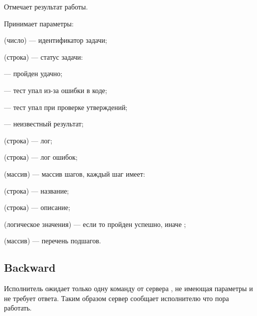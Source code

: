 Отмечает результат работы.

Принимает параметры:
\begin{icItems}
	\item {} (число) — идентификатор задачи;
	\item {} (строка) — статус задачи:
	\begin{icItems}
		\item {} — пройден удачно;
		\item {} — тест упал из-за ошибки в коде;
		\item {} — тест упал при проверке утверждений;
		\item {} — неизвестный результат;
	\end{icItems}
	\item {} (строка) — лог;
	\item {} (строка) — лог ошибок;
	\item {} (массив) — массив шагов, каждый шаг имеет:
	\begin{icItems}
		\item {} (строка) — название;
		\item {} (строка) — описание;
		\item {} (логическое значения) — если  то пройден успешно, иначе \jsinline{false};
		\item {} (массив) — перечень подшагов.
	\end{icItems}
\end{icItems}

\subsection{Backward}

Исполнитель ожидает только одну команду от сервера , не имеющая параметры и не требует ответа. Таким образом сервер сообщает исполнителю что пора работать.
